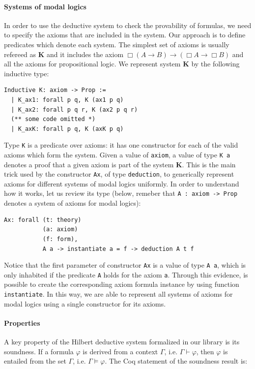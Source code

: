 \documentclass[sigconf]{acmart}
\begin{document}
\paragraph{Systems of modal logics} In order to use the deductive system to
check the provability of formulas, we need to specify the axioms that are
included in the system. Our approach is to define predicates
which denote each system. The simplest set of axioms is usually refereed as
\textbf{K} and it includes the axiom $\Box(A \to B) \to (\Box A \to \Box B)$
and all the axioms for propositional logic. We represent system \textbf{K}
by the following inductive type:
\begin{verbatim}
Inductive K: axiom -> Prop :=
  | K_ax1: forall p q, K (ax1 p q)
  | K_ax2: forall p q r, K (ax2 p q r)
  (** some code omitted *)
  | K_axK: forall p q, K (axK p q)
\end{verbatim}
Type \texttt{K} is a predicate over axioms: it has one constructor for
each of the valid axioms which form the system. Given a value
of \texttt{axiom}, a value of type \texttt{K a} denotes a
proof that a given axiom is part of the system \textbf{K}. This is the main
trick used by the constructor \texttt{Ax}, of type
\texttt{deduction}, to generically represent axioms for
different systems of modal logics uniformly. In order to understand how it
works, let us review its type (below, remeber that \texttt{A : axiom -> Prop}
denotes a system of axioms for modal logics):
\begin{verbatim}
Ax: forall (t: theory)
           (a: axiom)
           (f: form),
           A a -> instantiate a = f -> deduction A t f
\end{verbatim}
Notice that the first parameter of constructor \texttt{Ax} is a value
of type \texttt{A a}, which is only inhabited if the predicate
\texttt{A} holds for the axiom \texttt{a}. Through this
evidence, is possible to create the corresponding axiom formula instance by
using function \texttt{instantiate}. In this way, we are able to
represent all systems of axioms for modal logics using a single constructor
for its axioms.

\paragraph{Properties} A key property of the Hilbert deductive system formalized
in our library is its soundness. If a formula $\varphi$ is derived from a
context $\Gamma$, i.e. $\Gamma\vdash\varphi$, then $\varphi$ is entailed from
the set $\Gamma$, i.e. $\Gamma\models\varphi$. The Coq statement of the soundness
result is:
\end{document}
